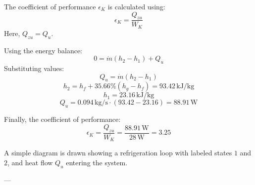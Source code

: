 The coefficient of performance \( \epsilon_K \) is calculated using:  
\[
\epsilon_K = \frac{Q_{zu}}{W_K}
\]  
Here, \( Q_{zu} = Q_u \).  

Using the energy balance:  
\[
0 = \dot{m}(h_2 - h_1) + Q_u
\]  
Substituting values:  
\[
Q_u = \dot{m}(h_2 - h_1)
\]  
\[
h_2 = h_f + 35.66\% (h_g - h_f) = 93.42 \, \text{kJ/kg}
\]  
\[
h_1 = 23.16 \, \text{kJ/kg}
\]  
\[
Q_u = 0.094 \, \text{kg/s} \cdot (93.42 - 23.16) = 88.91 \, \text{W}
\]  

Finally, the coefficient of performance:  
\[
\epsilon_K = \frac{Q_{zu}}{W_K} = \frac{88.91 \, \text{W}}{28 \, \text{W}} = 3.25
\]  

A simple diagram is drawn showing a refrigeration loop with labeled states \( 1 \) and \( 2 \), and heat flow \( Q_u \) entering the system.  

---